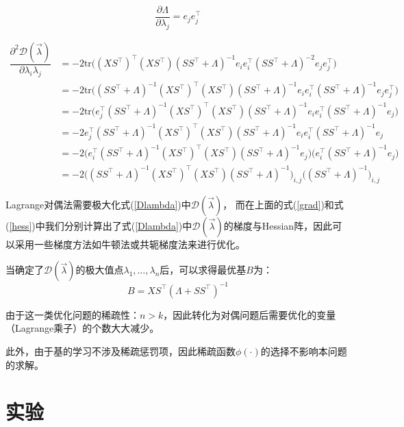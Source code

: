 \begin{equation}
   \dfrac{\partial \Lambda}{\partial \lambda_j}=e_je_j^{\top}
\end{equation}

\begin{align}\label{hess}
  \dfrac{\partial^2\mathcal{D}(\vec{\lambda})}{\partial \lambda_i\lambda_j} & =-2\text{tr}\Big((XS^{\top})^{\top}(XS^{\top})(SS^{\top}+\Lambda)^{-1}e_ie_i^{\top}(SS^{\top}+\Lambda)^{-2}e_je_j^{\top} \Big) \nonumber\\
   & =-2\text{tr}\Big((SS^{\top}+\Lambda)^{-1}(XS^{\top})^{\top}(XS^{\top})(SS^{\top}+\Lambda)^{-1}e_ie_i^{\top}(SS^{\top}+\Lambda)^{-1}e_je_j^{\top} \Big) \nonumber\\
   & =-2\text{tr}\Big(e_j^{\top}(SS^{\top}+\Lambda)^{-1}(XS^{\top})^{\top}(XS^{\top})(SS^{\top}+\Lambda)^{-1}e_ie_i^{\top}(SS^{\top}+\Lambda)^{-1}e_j \Big)\nonumber\\
&=-2e_j^{\top}(SS^{\top}+\Lambda)^{-1}(XS^{\top})^{\top}(XS^{\top})(SS^{\top}+\Lambda)^{-1}e_ie_i^{\top}(SS^{\top}+\Lambda)^{-1}e_j\nonumber\\
&=-2\Big(e_i^{\top}(SS^{\top}+\Lambda)^{-1}(XS^{\top})^{\top}(XS^{\top})(SS^{\top}+\Lambda)^{-1}e_j\Big)\Big(e_i^{\top}(SS^{\top}+\Lambda)^{-1}e_j\Big)\nonumber\\
&=-2\big((SS^{\top}+\Lambda)^{-1}(XS^{\top})^{\top}(XS^{\top})(SS^{\top}+\Lambda)^{-1}\big)_{i,j}\big((SS^{\top}+\Lambda)^{-1}\big)_{i,j}
\end{align}

Lagrange对偶法需要极大化式(\ref{Dlambda})中$\mathcal{D}(\vec{\lambda})$，
而在上面的式(\ref{grad})和式(\ref{hess})中我们分别计算出了式(\ref{Dlambda})中$\mathcal{D}(\vec{\lambda})$的梯度与Hessian阵，因此可以采用一些梯度方法如牛顿法或共轭梯度法来进行优化。

当确定了$\mathcal{D}(\vec{\lambda})$的极大值点$\lambda_1,\ldots,\lambda_n$后，可以求得最优基$B$为：
\begin{equation}\label{B}
  B=XS^{\top}(\Lambda+SS^{\top})^{-1}
\end{equation}

由于这一类优化问题的稀疏性：$n>k$，因此转化为对偶问题后需要优化的变量（Lagrange乘子）的个数大大减少。

此外，由于基的学习不涉及稀疏惩罚项，因此稀疏函数$\phi(\cdot)$的选择不影响本问题的求解。

\section{实验}
